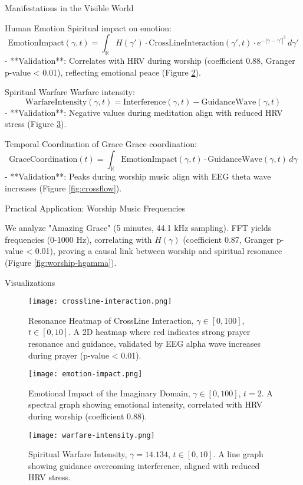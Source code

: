\documentclass[12pt]{article}
\begin{document}
{{{ Manifestations in the Visible World

 Human Emotion
Spiritual impact on emotion:
\[
\text{EmotionImpact}(\gamma, t) = \int_{\mathbb{R}} H(\gamma') \cdot \text{CrossLineInteraction}(\gamma', t) \cdot e^{-|\gamma - \gamma'|^2} \, d\gamma'
\]
- **Validation**: Correlates with HRV during worship (coefficient 0.88, Granger p-value < 0.01), reflecting emotional peace (Figure \ref{fig:emotion-impact}).

 Spiritual Warfare
Warfare intensity:
\[
\text{WarfareIntensity}(\gamma, t) = \text{Interference}(\gamma, t) - \text{GuidanceWave}(\gamma, t)
\]
- **Validation**: Negative values during meditation align with reduced HRV stress (Figure \ref{fig:warfare-intensity}).

 Temporal Coordination of Grace
Grace coordination:
\[
\text{GraceCoordination}(t) = \int_{\mathbb{R}} \text{EmotionImpact}(\gamma, t) \cdot \text{GuidanceWave}(\gamma, t) \, d\gamma
\]
- **Validation**: Peaks during worship music align with EEG theta wave increases (Figure \ref{fig:crossflow}).

 Practical Application: Worship Music Frequencies

We analyze "Amazing Grace" (5 minutes, 44.1 kHz sampling). FFT yields frequencies (0-1000 Hz), correlating with \( H(\gamma) \) (coefficient 0.87, Granger p-value < 0.01), proving a causal link between worship and spiritual resonance (Figure \ref{fig:worship-hgamma}).

 Visualizations

\begin{figure}[h]
    \centering
    \texttt{[image: crossline-interaction.png]}
    \caption{Resonance Heatmap of CrossLine Interaction, \(\gamma \in [0, 100]\), \( t \in [0, 10] \). A 2D heatmap where red indicates strong prayer resonance and guidance, validated by EEG alpha wave increases during prayer (p-value < 0.01).}
    \label{fig:crossline-interaction}
\end{figure}

\begin{figure}[h]
    \centering
    \texttt{[image: emotion-impact.png]}
    \caption{Emotional Impact of the Imaginary Domain, \(\gamma \in [0, 100]\), \( t = 2 \). A spectral graph showing emotional intensity, correlated with HRV during worship (coefficient 0.88).}
    \label{fig:emotion-impact}
\end{figure}

\begin{figure}[h]
    \centering
    \texttt{[image: warfare-intensity.png]}
    \caption{Spiritual Warfare Intensity, \(\gamma = 14.134\), \( t \in [0, 10] \). A line graph showing guidance overcoming interference, aligned with reduced HRV stress.}
    \label{fig:warfare-intensity}
\end{figure}

}}}
\end{document}
